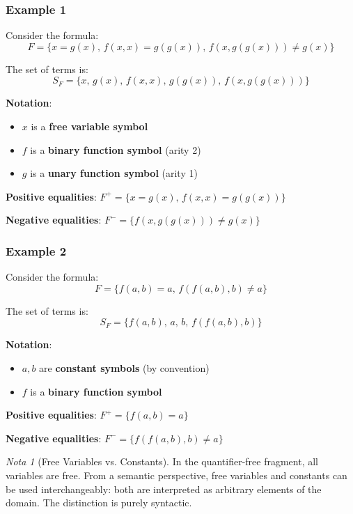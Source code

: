 \documentclass[11pt,a4paper]{article}
\theoremstyle{definition}
\theoremstyle{plain}
\theoremstyle{remark}
\newtheorem*{remark}{Nota}
\begin{document}
\subsubsection{Example 1}

Consider the formula:
\[
F = \{x = g(x), \, f(x, x) = g(g(x)), \, f(x, g(g(x))) \neq g(x)\}
\]

The set of terms is:
\[
S_F = \{x, \, g(x), \, f(x, x), \, g(g(x)), \, f(x, g(g(x)))\}
\]

\textbf{Notation}:
\begin{itemize}
    \item $x$ is a \textbf{free variable symbol}
    \item $f$ is a \textbf{binary function symbol} (arity 2)
    \item $g$ is a \textbf{unary function symbol} (arity 1)
\end{itemize}

\textbf{Positive equalities}: $F^+ = \{x = g(x), \, f(x, x) = g(g(x))\}$

\textbf{Negative equalities}: $F^- = \{f(x, g(g(x))) \neq g(x)\}$

\subsubsection{Example 2}

Consider the formula:
\[
F = \{f(a, b) = a, \, f(f(a, b), b) \neq a\}
\]

The set of terms is:
\[
S_F = \{f(a, b), \, a, \, b, \, f(f(a, b), b)\}
\]

\textbf{Notation}:
\begin{itemize}
    \item $a, b$ are \textbf{constant symbols} (by convention)
    \item $f$ is a \textbf{binary function symbol}
\end{itemize}

\textbf{Positive equalities}: $F^+ = \{f(a, b) = a\}$

\textbf{Negative equalities}: $F^- = \{f(f(a, b), b) \neq a\}$

\begin{remark}[Free Variables vs. Constants]
In the quantifier-free fragment, all variables are free. From a semantic perspective, free variables and constants can be used interchangeably: both are interpreted as arbitrary elements of the domain. The distinction is purely syntactic.
\end{remark}
\end{document}
